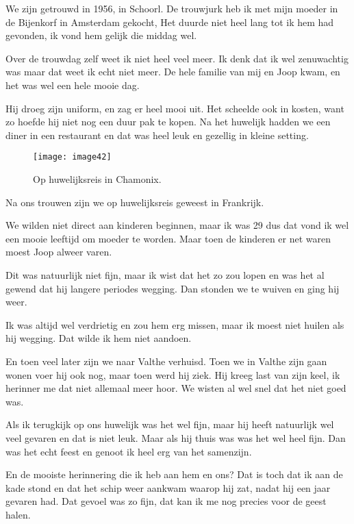 We zijn getrouwd in 1956, in Schoorl. De trouwjurk heb ik met mijn moeder in de Bijenkorf in Amsterdam gekocht, Het duurde niet heel lang tot ik hem had gevonden, ik vond hem gelijk die middag wel.

Over de trouwdag zelf weet ik niet heel veel meer. Ik denk dat ik wel zenuwachtig was maar dat weet ik echt niet meer. De hele familie van mij en Joop kwam, en het was wel een hele mooie dag. 

Hij droeg zijn uniform, en zag er heel mooi uit. Het scheelde ook in kosten, want zo hoefde hij niet nog een duur pak te kopen. Na het huwelijk hadden we een diner in een restaurant en dat was heel leuk en gezellig in kleine setting.

\begin{figure}[h]
    \begin{centering}
    \texttt{[image: image42]}
    \caption{Op huwelijksreis in Chamonix.}
    \end{centering}
\end{figure}
 
Na ons trouwen zijn we op huwelijksreis geweest in Frankrijk.

We wilden niet direct aan kinderen beginnen, maar ik was 29 dus dat vond ik wel een mooie leeftijd om moeder te worden. Maar toen de kinderen er net waren moest Joop alweer varen.

Dit was natuurlijk niet fijn, maar ik wist dat het zo zou lopen en was het al gewend dat hij langere periodes wegging. Dan stonden we te wuiven en ging hij weer.

Ik was altijd wel verdrietig en zou hem erg missen, maar ik moest niet huilen als hij wegging. Dat wilde ik hem niet aandoen. 

En toen veel later zijn we naar Valthe verhuisd. Toen we in Valthe zijn gaan wonen voer hij ook nog, maar toen werd hij ziek. Hij kreeg last van zijn keel, ik herinner me dat niet allemaal meer hoor. We wisten al wel snel dat het niet goed was.

Als ik terugkijk op ons huwelijk was het wel fijn, maar hij heeft natuurlijk wel veel gevaren en dat is niet leuk. Maar als hij thuis was was het wel heel fijn. Dan was het echt feest en genoot ik heel erg van het samenzijn.

En de mooiste herinnering die ik heb aan hem en ons? Dat is toch dat ik aan de kade stond en dat het schip weer aankwam waarop hij zat, nadat hij een jaar gevaren had. Dat gevoel was zo fijn, dat kan ik me nog precies voor de geest halen.
